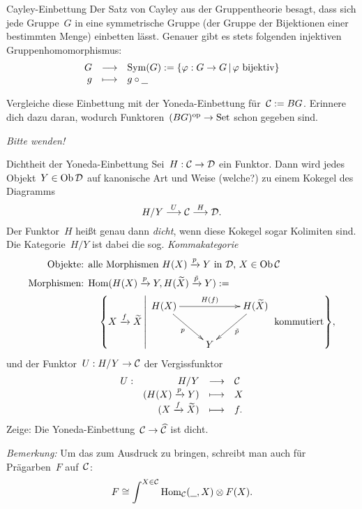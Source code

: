 \documentclass{pizzablatt}
\begin{document}
\begin{aufgabe}{Cayley-Einbettung}
Der Satz von Cayley aus der Gruppentheorie besagt, dass sich jede Gruppe~$G$ in
eine symmetrische Gruppe (der Gruppe der Bijektionen einer bestimmten Menge)
einbetten lässt. Genauer gibt es stets folgenden injektiven
Gruppenhomomorphismus:
\[ \begin{array}{@{}rcl@{}}
  G &\longrightarrow& \operatorname{Sym}(G) := \{ \varphi : G \to G \,|\,
  \text{$\varphi$ bijektiv} \} \\
  g &\longmapsto& g \circ \freist
\end{array} \]

Vergleiche diese Einbettung mit der Yoneda-Einbettung für~$\mathcal{C} := BG$.
Erinnere dich dazu daran, wodurch Funktoren~$(BG)^{\mathrm{op}} \to \mathrm{Set}$ schon gegeben
sind.
\end{aufgabe}

\emph{Bitte wenden!}

\newpage

\begin{aufgabe}{Dichtheit der Yoneda-Einbettung}
Sei~$H:\mathcal{C}\to\mathcal{D}$ ein Funktor. Dann wird jedes Objekt~$Y \in \operatorname{Ob}\mathcal{D}$ auf
kanonische Art und Weise (welche?) zu einem Kokegel des Diagramms
\[ H/Y \stackrel{U}{\longrightarrow} \mathcal{C} \stackrel{H}{\longrightarrow} \mathcal{D}. \]
Der Funktor~$H$ heißt genau dann \emph{dicht}, wenn diese Kokegel sogar
Kolimiten sind. Die Kategorie~$H/Y$ ist dabei die sog. \emph{Kommakategorie}
\begin{align*}
  \text{Objekte: } & \text{alle Morphismen $H(X) \xra{p} Y$ in~$\D$, $X \in \Ob\C$} \\
  \text{Morphismen: } &
    \Hom(H(X) \xra{p} Y, H(\widetilde X) \xra{\tilde p} Y) := \\ &
      \quad\left\{ X \xra{f} \widetilde X \,\middle|\, \text{$
        \vcenter{\xymatrix{
          H(X) \ar[rr]^{H(f)} \ar[rd]_p && H(\widetilde X) \ar[dl]^{\tilde p} \\
          & Y
        }}$ kommutiert} \right\}\!,
\end{align*}
und der Funktor~$U : H/Y \to \mathcal{C}$ der Vergissfunktor
\[ \begin{array}{@{}rrcl@{}}
  U : & H/Y &\longrightarrow& \C \\
  & (H(X) \xra{p} Y) &\longmapsto& X \\
  & (X \xra{f} \widetilde X) &\longmapsto& f.
\end{array} \]
Zeige: Die Yoneda-Einbettung~$\mathcal{C} \to \widehat{\mathcal{C}}$ ist dicht.

\emph{Bemerkung:} Um das zum Ausdruck zu bringen, schreibt man auch für
Prägarben~$F$ auf~$\mathcal{C}$:
\[ F \cong \int^{X \in \mathcal{C}} \mathrm{Hom}_{\mathcal{C}}(\underline{\ \ },X) \otimes F(X). \]
\end{aufgabe}
\end{document}
